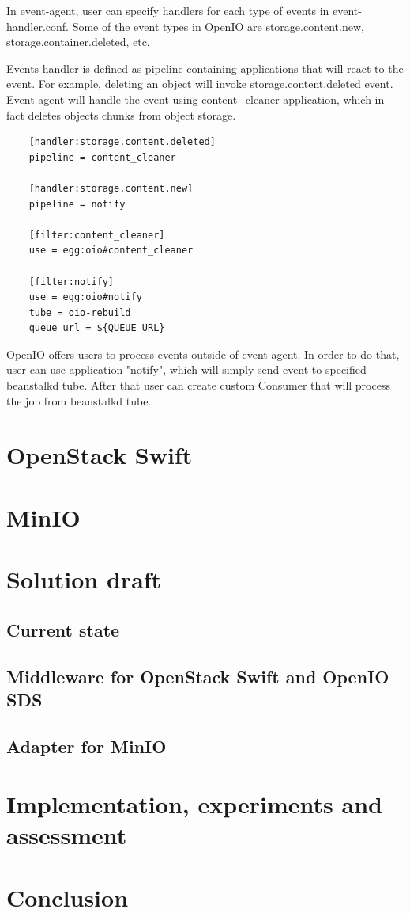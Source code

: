     In event-agent, user can specify handlers for each type of events in event-handler.conf.
    Some of the event types in OpenIO are storage.content.new, storage.container.deleted, etc.

    Events handler is defined as pipeline containing applications that will react to the event. For example, deleting an object will invoke storage.content.deleted event. Event-agent will handle the event using content\_cleaner application, which in fact deletes objects chunks from object storage.

    \begin{lstlisting}
    [handler:storage.content.deleted]
    pipeline = content_cleaner

    [handler:storage.content.new]
    pipeline = notify

    [filter:content_cleaner]
    use = egg:oio#content_cleaner

    [filter:notify]
    use = egg:oio#notify
    tube = oio-rebuild
    queue_url = ${QUEUE_URL}
    \end{lstlisting}

    OpenIO offers users to process events outside of event-agent. In order to do that, user can use application "notify", which will simply send event to specified beanstalkd tube. After that user can create custom Consumer that will process the job from beanstalkd tube.

\chapter{OpenStack Swift}
\chapter{MinIO}

\chapter{Solution draft}
\section{Current state}
\section{Middleware for OpenStack Swift and OpenIO SDS}
\section{Adapter for MinIO}
\chapter{Implementation, experiments and assessment}

\chapter{Conclusion}

